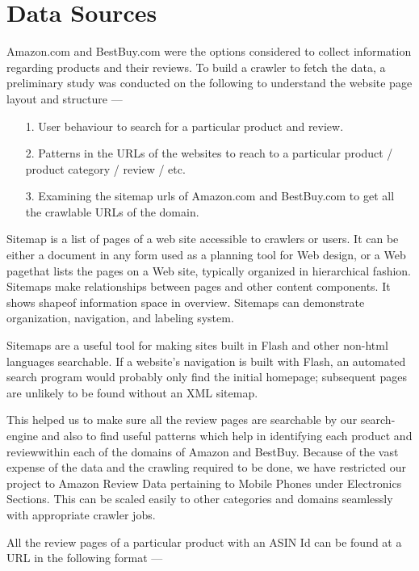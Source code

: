 \documentclass{article}
\begin{document}
\section{Data Sources}
Amazon.com and BestBuy.com were the options considered to collect information regarding products and their reviews. To build a crawler to fetch the data, a preliminary study was conducted on the following to understand the website page layout and structure ---

\begin{enumerate}
	\item[1. ] User behaviour to search for a particular product and review.
	\item[2. ] Patterns in the URLs of the websites to reach to a particular product / product category / review / etc.
	\item[3. ] Examining the sitemap urls of Amazon.com and BestBuy.com to get all the crawlable URLs of the domain.
\end{enumerate} 

Sitemap is a list of pages of a web site accessible to crawlers or users. It can be either a document in any form used as a planning tool for Web design, or a Web pagethat lists the pages on a Web site, typically organized in hierarchical fashion. Sitemaps make relationships between pages and other content components. It shows shapeof information space in overview. Sitemaps can demonstrate organization, navigation, and labeling system.~\cite{wiki:sitemap}

Sitemaps are a useful tool for making sites built in Flash and other non-html languages searchable. If a website's navigation is built with Flash, an automated search program would probably only find the initial homepage; subsequent pages are unlikely to be found without an XML sitemap.~\cite{wiki:sitemap}

This helped us to make sure all the review pages are searchable by our search-engine and also to find useful patterns which help in identifying each product and reviewwithin each of the domains of Amazon and BestBuy. Because of the vast expense of the data and the crawling required to be done, we have restricted our project to Amazon Review Data pertaining to Mobile Phones under Electronics Sections. This can be scaled easily to other categories and domains seamlessly with appropriate crawler jobs. 

All the review pages of a particular product with an ASIN Id can be found at a URL in the following format ---
\end{document}

